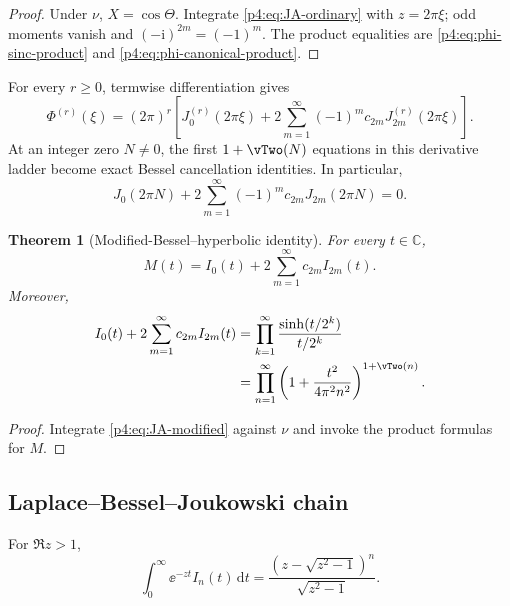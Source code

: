 \documentclass[11pt,oneside]{article}
\newtheorem{theorem}{Theorem}[section]
\theoremstyle{definition}
\newcommand{\dd}{\,\mathrm d}
\newcommand{\ii}{\mathrm i}
\begin{document}
\begin{proof}
Under \(\nu\), \(X=\cos\Theta\). Integrate \eqref{p4:eq:JA-ordinary} with
\(z=2\pi\xi\); odd moments vanish and \((-\ii)^{2m}=(-1)^m\). The product equalities are
\eqref{p4:eq:phi-sinc-product} and \eqref{p4:eq:phi-canonical-product}.
\end{proof}

For every \(r\ge0\), termwise differentiation gives
\begin{equation}
 \Phi^{(r)}(\xi)=(2\pi)^r\left[J_0^{(r)}(2\pi\xi)
 +2\sum_{m=1}^{\infty}(-1)^mc_{2m}J_{2m}^{(r)}(2\pi\xi)\right].
 \label{p4:eq:Phi-Bessel-derivatives}
\end{equation}
At an integer zero \(N\ne0\), the first \(1+\vTwo(N)\) equations in this derivative ladder
become exact Bessel cancellation identities. In particular,
\begin{equation}
 J_0(2\pi N)+2\sum_{m=1}^{\infty}(-1)^mc_{2m}J_{2m}(2\pi N)=0.
 \label{p4:eq:Bessel-integer-zero}
\end{equation}

\begin{theorem}[Modified-Bessel--hyperbolic identity]
\label{p4:thm:Bessel-M}
For every \(t\in\mathbb C\),
\begin{equation}
 \boxed{\displaystyle
 M(t)=I_0(t)+2\sum_{m=1}^{\infty}c_{2m}I_{2m}(t).}
 \label{p4:eq:M-Bessel}
\end{equation}
Moreover,
\begin{align}
 I_0(t)+2\sum_{m=1}^{\infty}c_{2m}I_{2m}(t)
 &=\prod_{k=1}^{\infty}\frac{\sinh(t/2^k)}{t/2^k}
 \label{p4:eq:IBessel-hyperbolic}\\
 &=\prod_{n=1}^{\infty}\left(1+\frac{t^2}{4\pi^2n^2}\right)^{1+\vTwo(n)}.
 \label{p4:eq:IBessel-canonical}
\end{align}
\end{theorem}

\begin{proof}
Integrate \eqref{p4:eq:JA-modified} against \(\nu\) and invoke the product formulas for \(M\).
\end{proof}

\subsection{Laplace--Bessel--Joukowski chain}

For \(\Re z>1\),
\begin{equation}
 \int_0^{\infty}\ee^{-zt}I_n(t)\dd t
 =\frac{(z-\sqrt{z^2-1})^n}{\sqrt{z^2-1}}.
 \label{p4:eq:Laplace-In}
\end{equation}
\end{document}
